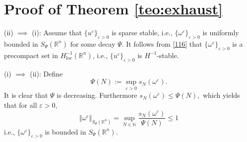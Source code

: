 \documentclass[11pt, a4paper,leqno]{amsart}
\theoremstyle{plain}
\newtheorem{corollary}{Corollary}
\numberwithin{equation}{section}
\theoremstyle{definition}
\theoremstyle{remark}
\newtheorem{remark}{Remark}
\def\R{\mathbb{R}}
\begin{document}
%
%
%
%
%

\section{Proof of Theorem \ref{teo:exhaust}\label{sec:construcciones}}

(ii) $\implies$ (i): Assume that $\{u^\varepsilon\}_{\varepsilon > 0}$  is sparse stable, i.e., $\{\omega^\varepsilon\}_{\varepsilon > 0}$ is uniformly bounded in $S_\Psi(\R^n)$ for some decay $\Psi$.  It follows from \eqref{116} that $\{\omega^\varepsilon\}_{\varepsilon > 0}$ is a precompact set in $H^{-1}_{\text{loc}}(\R^n)$, i.e., $\{u^\varepsilon\}_{\varepsilon > 0}$ is $H^{-1}$-stable. 

(i) $\implies$ (ii): Define
\begin{equation}
\Psi(N):=\sup_{\varepsilon>0}s_{N}(\omega^{\varepsilon
}).\label{PsiDef}%
\end{equation}
It is clear that $\Psi$ is decreasing. Furthermore $
s_{N}(\omega^{\varepsilon})\leq\Psi(N),$
which yields that for all $\varepsilon>0$,
\[
\Vert\omega^{\varepsilon}\Vert_{S_{\Psi}(\R^n)}=\sup_{N\in\mathbb{N}%
}\frac{s_{N}(\omega^{\varepsilon})}{\Psi(N)}\leq1
\]
i.e., $\{\omega^{\varepsilon}\}_{\varepsilon > 0}$ is bounded in $S_{\Psi}(\R^n)$.
\end{document}

